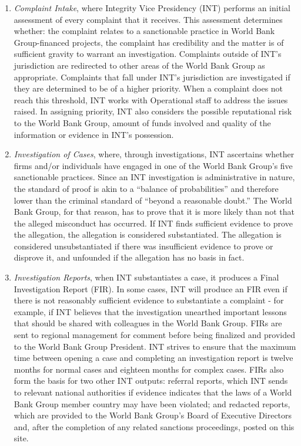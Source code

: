\begin{enumerate}[1.]
\item \textit{Complaint Intake}, where Integrity Vice Presidency (INT) performs an initial assessment of every complaint that it receives.  This assessment determines whether: the complaint relates to a sanctionable practice in World Bank Group-financed projects, the complaint has credibility and the matter is of sufficient gravity to warrant an investigation.  Complaints outside of INT's jurisdiction are redirected to other areas of the World Bank Group as appropriate.  Complaints that fall under INT's jurisdiction are investigated if they are determined to be of a higher priority.  When a complaint does not reach this threshold, INT works with Operational staff to address the issues raised.  In assigning priority, INT also considers the possible reputational risk to the World Bank Group, amount of funds involved and quality of the information or evidence in INT's possession. 

\item \textit{Investigation of Cases}, where, through investigations, INT ascertains whether firms and/or individuals have engaged in one of the World Bank Group's five sanctionable practices.  Since an INT investigation is administrative in nature, the standard of proof is akin to a ``balance of probabilities'' and therefore lower than the criminal standard of ``beyond a reasonable doubt.'' The World Bank Group, for that reason, has to prove that it is more likely than not that the alleged misconduct has occurred.  If INT finds sufficient evidence to prove the allegation, the allegation is considered substantiated.  The allegation is considered unsubstantiated if there was insufficient evidence to prove or disprove it, and unfounded if the allegation has no basis in fact.

\item \textit{Investigation Reports}, when INT substantiates a case, it produces a Final Investigation Report (FIR).  In some cases, INT will produce an FIR even if there is not reasonably sufficient evidence to substantiate a complaint - for example, if INT believes that the investigation unearthed important lessons that should be shared with colleagues in the World Bank Group.  FIRs are sent to regional management for comment before being finalized and provided to the World Bank Group President. INT strives to ensure that the maximum time between opening a case and completing an investigation report is twelve months for normal cases and eighteen months for complex cases. FIRs also form the basis for two other INT outputs: referral reports, which INT sends to relevant national authorities if evidence indicates that the laws of a World Bank Group member country may have been violated; and redacted reports, which are provided to the World Bank Group's Board of Executive Directors and, after the completion of any related sanctions proceedings, posted on this site.
\end{enumerate}

